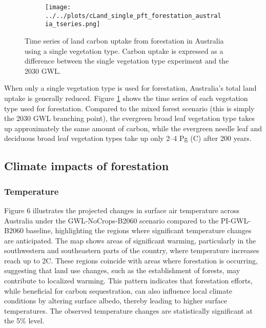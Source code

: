 \documentclass[]{article}
\begin{document}

\begin{figure}[H]
    \centering
    \begin{subfigure}[b]{\linewidth}
        \texttt{[image: ../../plots/cLand\_single\_pft\_forestation\_australia\_tseries.png]}
    \end{subfigure}
    \caption{Time series of land carbon uptake from forestation in Australia using a single vegetation type. Carbon uptake is expressed as a difference between the single vegetation type experiment and the 2030 GWL.}
    \label{fig:australia_cLand_tseries_veg_type}
\end{figure}

When only a single vegetation type is used for forestation, Australia's total land uptake is generally reduced.
Figure \ref{fig:australia_cLand_tseries_veg_type} shows the time series of each vegetation type used for forestation.
Compared to the mixed forest scenario (this is simply the 2030 GWL branching point), the evergreen broad leaf vegetation type takes up approximately the same amount of carbon, while the evergreen needle leaf and deciduous broad leaf vegetation types take up only 2--4 Pg (C) after 200 years.

\subsection{Climate impacts of forestation}

\subsubsection{Temperature}

Figure 6 illustrates the projected changes in surface air temperature across Australia under the GWL-NoCrops-B2060 scenario compared to the PI-GWL-B2060 baseline, highlighting the regions where significant temperature changes are anticipated.
The map shows areas of significant warming, particularly in the southwestern and southeastern parts of the country, where temperature increases reach up to 2\textdegree{}C.
These regions coincide with areas where forestation is occurring, suggesting that land use changes, such as the establishment of forests, may contribute to localized warming.
This pattern indicates that forestation efforts, while beneficial for carbon sequestration, can also influence local climate conditions by altering surface albedo, thereby leading to higher surface temperatures.
The observed temperature changes are statistically significant at the 5\% level.
\end{document}
